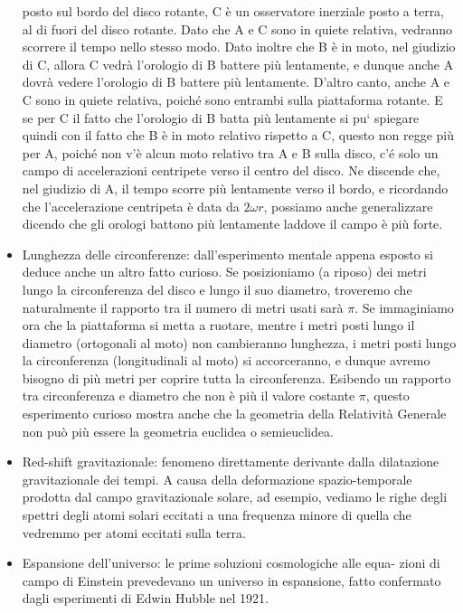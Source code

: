 \begin{itemize}
posto sul bordo del disco rotante, C è un osservatore inerziale posto
a terra, al di fuori del disco rotante. Dato che A e C sono in quiete
relativa, vedranno scorrere il tempo nello stesso modo. Dato inoltre che
B è in moto, nel giudizio di C, allora C vedrà l'orologio di B battere
più lentamente, e dunque anche A dovrà vedere l'orologio di B battere
più lentamente.
D'altro canto, anche A e C sono in quiete relativa, poiché sono entrambi
sulla piattaforma rotante. E se per C il fatto che l'orologio di B batta
più lentamente si pu` spiegare quindi con il fatto che B è in moto
relativo rispetto a C, questo non regge più per A, poiché non v'è alcun
moto relativo tra A e B sulla disco, c'é solo un campo di accelerazioni
centripete verso il centro del disco. Ne discende che, nel giudizio di
A, il tempo scorre più lentamente verso il bordo, e ricordando che
l'accelerazione centripeta è data da $2 \omega r$, possiamo anche generalizzare
dicendo che gli orologi battono più lentamente laddove il campo è più
forte.
 \item Lunghezza delle circonferenze: dall'esperimento mentale appena
esposto si deduce anche un altro fatto curioso. Se posizioniamo (a
riposo) dei metri lungo la circonferenza del disco e lungo il suo diametro,
troveremo che naturalmente il rapporto tra il numero di metri usati sarà
$\pi$. Se immaginiamo ora che la piattaforma si metta a ruotare, mentre
i metri posti lungo il diametro (ortogonali al moto) non cambieranno
lunghezza, i metri posti lungo la circonferenza (longitudinali al moto) si
accorceranno, e dunque avremo bisogno di più metri per coprire tutta
la circonferenza. Esibendo un rapporto tra circonferenza e diametro
che non è più il valore costante $\pi$, questo esperimento curioso mostra
anche che la geometria della Relatività Generale non può più essere la
geometria euclidea o semieuclidea.
 \item Red-shift gravitazionale: fenomeno direttamente derivante dalla dilatazione 
gravitazionale dei tempi. A causa della deformazione spazio-temporale 
prodotta dal campo gravitazionale solare, ad esempio, vediamo 
le righe degli spettri degli atomi solari eccitati a una frequenza
minore di quella che vedremmo per atomi eccitati sulla terra.
 \item Espansione dell'universo: le prime soluzioni cosmologiche alle equa-
zioni di campo di Einstein prevedevano un universo in espansione, fatto
confermato dagli esperimenti di Edwin Hubble nel 1921.
\end{itemize}


